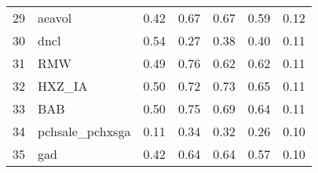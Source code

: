 \documentclass[12pt]{article}
\begin{document}
\begin{footnotesize}
\begin{longtable}{rl|c|c|c|c|c}
29  & aeavol           & 0.42                                                                                      & 0.67                                                                                        & 0.67                                                                                         & 0.59 & 0.12               \\
30  & dncl             & 0.54                                                                                      & 0.27                                                                                        & 0.38                                                                                         & 0.40 & 0.11               \\
31  & RMW              & 0.49                                                                                      & 0.76                                                                                        & 0.62                                                                                         & 0.62 & 0.11               \\
32  & HXZ\_IA          & 0.50                                                                                      & 0.72                                                                                        & 0.73                                                                                         & 0.65 & 0.11               \\
33  & BAB              & 0.50                                                                                      & 0.75                                                                                        & 0.69                                                                                         & 0.64 & 0.11               \\
34  & pchsale\_pchxsga & 0.11                                                                                      & 0.34                                                                                        & 0.32                                                                                         & 0.26 & 0.10               \\
35  & gad              & 0.42                                                                                      & 0.64                                                                                        & 0.64                                                                                         & 0.57 & 0.10               \\

\end{longtable}
\end{footnotesize}
\end{document}
